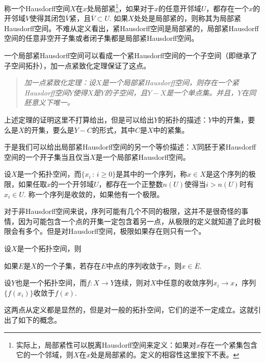 \begin{para}
称一个Hausdorff空间$X$在$x$处局部紧\footnote{实际上，局部紧性可以脱离Hausdorff空间来定义：如果对$x$存在一个紧集包含它的一个邻域，则$X$在$x$处是局部紧的。定义的相容性这里按下不表。}，如果对于$x$的任意开邻域$U$，都存在一个$x$的开邻域$V$使得其闭包$\overline{V}$紧，且$\overline{V}\subset U$. 如果$X$处处是局部紧的，则称其为局部紧Hausdorff空间。不难从定义看出，紧Hausdorff空间是局部紧的，局部紧Hausdorff空间的任意非空开子集或者闭子集都是局部紧Hausdorff空间。

一个局部紧Hausdorff空间可以看成一个紧Hausdorff空间的一个子空间（即继承了子空间拓扑），加一点紧致化定理保证了这点。
\begin{quote}\it
	加一点紧致化定理：设$X$是一个局部紧Hausdorff空间，则存在一个紧Hausdorff空间$Y$使得$X$是$Y$的子空间，且$Y-X$是一个单点集。并且，$Y$在同胚意义下唯一。
\end{quote}
上述定理的证明这里不打算给出，但是可以给出$Y$的拓扑的描述：$Y$中的开集，要么是$X$的开集，要么是$Y-C$的形式，其中$C$是$X$中的紧集。

于是我们可以给出局部紧Hausdorff空间的另一个等价描述：$X$同胚于紧Hausdorff空间的一个开子集当且仅当$X$是一个局部紧Hausdorff空间。
\end{para}

\begin{para}
	设$X$是一个拓扑空间，而$\{x_i\,:\, i\geq 0\}$是其中的一个序列，称$x\in X$是这个序列的极限，如果任取$x$的一个开邻域$U$，都存在一个正整数$n(U)$使得当$i>n(U)$时有$x_i\in U$. 称一个序列是收敛的，如果他有一个极限。

	对于非Hausdorff空间来说，序列可能有几个不同的极限，这并不是很奇怪的事情，因为可能包含一个点的开集一定包含着另一点，从极限的定义就知道了此时极限会有多个。但是对Hausdorff空间，极限如果存在则只有一个。
\end{para}

\begin{lem}\label{1.7}
设$X$是一个拓扑空间，则
\begin{compactenum}[(a)]
\item 如果$E$是$X$的一个子集，若存在$E$中点的序列收敛于$x$，则$x\in \overline{E}$.
\item 设$Y$也是一个拓扑空间，而$f:X\to Y$连续，则对$X$中任意的收敛序列$x_i\to x$，序列$\{f(x_i)\}$收敛于$f(x)$.
\end{compactenum}
\end{lem}

这两点从定义都是显然的，但是对一般的拓扑空间，它们的逆不一定成立。这就引出了如下的概念。

